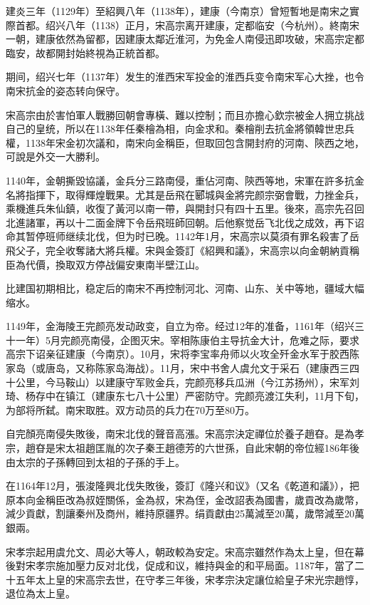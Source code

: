 建炎三年（1129年）至紹興八年（1138年），建康（今南京）曾短暫地是南宋之實際首都。绍兴八年（1138）正月，宋高宗离开建康，定都临安（今杭州）。終南宋一朝，建康依然為留都，因建康太鄰近淮河，为免金人南侵迅即攻破，宋高宗定都臨安，故都開封始終視為正統首都。

期间，绍兴七年（1137年）发生的淮西宋军投金的淮西兵变令南宋军心大挫，也令南宋抗金的姿态转向保守。

宋高宗由於害怕軍人戰勝回朝會專橫、難以控制；而且亦擔心欽宗被金人拥立挑战自己的皇统，所以在1138年任秦檜為相，向金求和。秦檜削去抗金將領韓世忠兵權，1138年宋金初次議和，南宋向金稱臣，但取回包含開封府的河南、陝西之地，可說是外交一大勝利。

1140年，金朝撕毀協議，金兵分三路南侵，重佔河南、陝西等地，宋軍在許多抗金名將指揮下，取得輝煌戰果。尤其是岳飛在郾城與金將完颜宗弼會戰，力挫金兵，乘機進兵朱仙鎮，收復了黃河以南一帶，與開封只有四十五里。後來，高宗先召回北進諸軍，再以十二面金牌下令岳飛班師回朝。后他察觉岳飞北伐之成效，再下诏命其暂停班师继续北伐，但为时已晚。1142年1月，宋高宗以莫須有罪名殺害了岳飛父子，完全收奪諸大將兵權。宋與金簽訂《紹興和議》，宋高宗以向金朝納貢稱臣為代價，換取双方停战偏安東南半壁江山。

比建国初期相比，稳定后的南宋不再控制河北、河南、山东、关中等地，疆域大幅缩水。

1149年，金海陵王完颜亮发动政变，自立为帝。经过12年的准备，1161年（绍兴三十一年）5月完颜亮南侵，企图灭宋。宰相陈康伯主导抗金大计，危难之际，要求高宗下诏亲征建康（今南京）。10月，宋将李宝率舟师以火攻全歼金水军于胶西陈家岛（或唐岛，又称陈家岛海战）。11月，宋中书舍人虞允文于采石（建康西三四十公里，今马鞍山）以建康守军败金兵，完颜亮移兵瓜洲（今江苏扬州），宋军刘琦、杨存中在镇江（建康东七八十公里）严密防守。完颜亮渡江失利，11月下旬，为部将所弑。南宋取胜。双方动员的兵力在70万至80万。

自完顏亮南侵失敗後，南宋北伐的聲音高漲。宋高宗決定禪位於養子趙昚。是為孝宗，趙昚是宋太祖趙匡胤的次子秦王趙德芳的六世孫，自此宋朝的帝位經186年後由太宗的子孫轉回到太祖的子孫的手上。

在1164年12月，張浚隆興北伐失敗後，簽訂《隆兴和议》（又名《乾道和議》），把原本向金稱臣改為叔姪關係，金為叔，宋為侄，金改詔表為國書，歲貢改為歲幣，減少貢獻，割讓秦州及商州，維持原疆界。绢貢獻由25萬減至20萬，歲幣減至20萬銀兩。

宋孝宗起用虞允文、周必大等人，朝政較為安定。宋高宗雖然作為太上皇，但在幕後對宋孝宗施加壓力反对北伐，促成和议，維持與金的和平局面。1187年，當了二十五年太上皇的宋高宗去世，在守孝三年後，宋孝宗決定讓位給皇子宋光宗趙惇，退位為太上皇。

